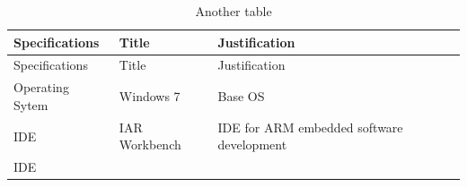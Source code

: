 \documentclass[]{book}
\begin{document}
\hypertarget{tbl:my_tble}{}
\begin{longtable}[]{@{}lll@{}}
\caption{\label{tbl:my_tble}Another table }\tabularnewline
\toprule
\begin{minipage}[b]{0.13\columnwidth}\raggedright\strut
Specifications\strut
\end{minipage} & \begin{minipage}[b]{0.13\columnwidth}\raggedright\strut
Title\strut
\end{minipage} & \begin{minipage}[b]{0.64\columnwidth}\raggedright\strut
Justification\strut
\end{minipage}\tabularnewline
\midrule
\endfirsthead
\toprule
\begin{minipage}[b]{0.13\columnwidth}\raggedright\strut
Specifications\strut
\end{minipage} & \begin{minipage}[b]{0.13\columnwidth}\raggedright\strut
Title\strut
\end{minipage} & \begin{minipage}[b]{0.64\columnwidth}\raggedright\strut
Justification\strut
\end{minipage}\tabularnewline
\midrule
\endhead
\begin{minipage}[t]{0.13\columnwidth}\raggedright\strut
Operating Sytem\strut
\end{minipage} & \begin{minipage}[t]{0.13\columnwidth}\raggedright\strut
Windows 7\strut
\end{minipage} & \begin{minipage}[t]{0.64\columnwidth}\raggedright\strut
Base OS\strut
\end{minipage}\tabularnewline
\begin{minipage}[t]{0.13\columnwidth}\raggedright\strut
IDE\strut
\end{minipage} & \begin{minipage}[t]{0.13\columnwidth}\raggedright\strut
IAR Workbench\strut
\end{minipage} & \begin{minipage}[t]{0.64\columnwidth}\raggedright\strut
IDE for ARM embedded software development\strut
\end{minipage}\tabularnewline
\begin{minipage}[t]{0.13\columnwidth}\raggedright\strut
IDE\strut
\end{minipage} & \begin{minipage}[t]{0.13\columnwidth}\raggedright\strut

\end{minipage}
\end{longtable}
\end{document}
